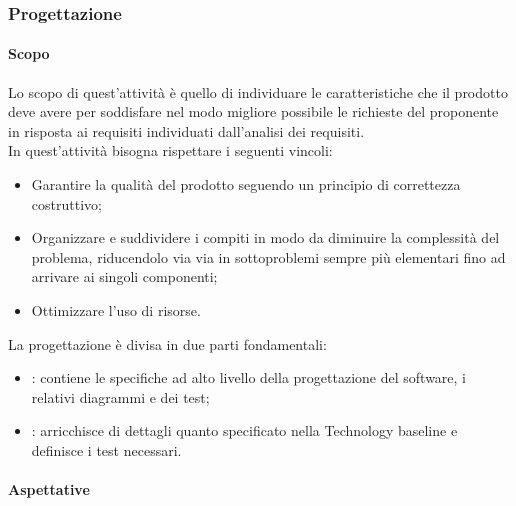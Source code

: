 \subsubsection{Progettazione}
\label{ssub:progettazione}

\paragraph{Scopo}
\label{par:progettazione:scopo}

Lo scopo di quest'attività è quello di individuare le caratteristiche che il prodotto deve avere per soddisfare nel
modo migliore possibile le richieste del proponente in risposta ai requisiti individuati dall'analisi dei requisiti. \\
In quest'attività bisogna rispettare i seguenti vincoli:
\begin{itemize}
    \item Garantire la qualità del prodotto seguendo un principio di correttezza costruttivo;
    \item Organizzare e suddividere i compiti in modo da diminuire la complessità del problema, riducendolo via via in
    sottoproblemi sempre più elementari fino ad arrivare ai singoli componenti;
    \item Ottimizzare l'uso di risorse.
\end{itemize}

La progettazione è divisa in due parti fondamentali:
\begin{itemize}
    \item {}: contiene le specifiche ad alto livello della progettazione del software,
    i relativi diagrammi  e dei test;
    \item {}: arricchisce di dettagli quanto specificato nella Technology baseline e
    definisce i test necessari.
\end{itemize}

\paragraph{Aspettative}

